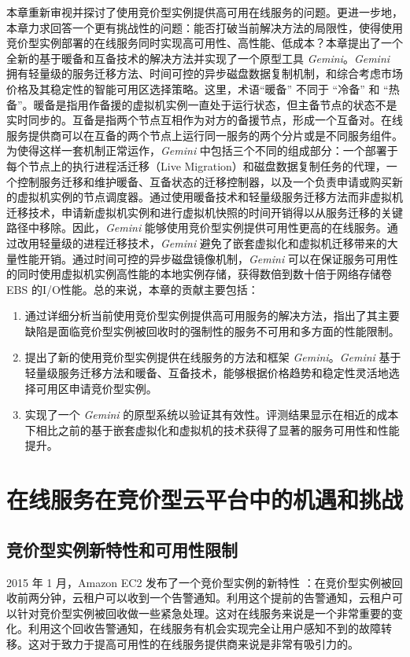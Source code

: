 本章重新审视并探讨了使用竞价型实例提供高可用在线服务的问题。更进一步地，本章力求回答一个更有挑战性的问题：能否打破当前解决方法的局限性，使得使用竞价型实例部署的在线服务同时实现高可用性、高性能、低成本？本章提出了一个全新的基于暖备和互备技术的解决方法并实现了一个原型工具 \emph{Gemini}。\emph{Gemini} 拥有轻量级的服务迁移方法、时间可控的异步磁盘数据复制机制，和综合考虑市场价格及其稳定性的智能可用区选择策略。这里，术语``暖备'' 不同于 ``冷备'' 和 ``热备''。暖备是指用作备援的虚拟机实例一直处于运行状态，但主备节点的状态不是实时同步的。互备是指两个节点互相作为对方的备援节点，形成一个互备对。在线服务提供商可以在互备的两个节点上运行同一服务的两个分片或是不同服务组件。为使得这样一套机制正常运作，\emph{Gemini} 中包括三个不同的组成部分：一个部署于每个节点上的执行进程活迁移（Live Migration）和磁盘数据复制任务的代理，一个控制服务迁移和维护暖备、互备状态的迁移控制器，以及一个负责申请或购买新的虚拟机实例的节点调度器。通过使用暖备技术和轻量级服务迁移方法而非虚拟机迁移技术，申请新虚拟机实例和进行虚拟机快照的时间开销得以从服务迁移的关键路径中移除。因此，\emph{Gemini} 能够使用竞价型实例提供可用性更高的在线服务。通过改用轻量级的进程迁移技术，\emph{Gemini} 避免了嵌套虚拟化和虚拟机迁移带来的大量性能开销。通过时间可控的异步磁盘镜像机制，\emph{Gemini} 可以在保证服务可用性的同时使用虚拟机实例高性能的本地实例存储，获得数倍到数十倍于网络存储卷 EBS 的I/O性能。总的来说，本章的贡献主要包括：
\begin{enumerate}
\item 通过详细分析当前使用竞价型实例提供高可用服务的解决方法，指出了其主要缺陷是面临竞价型实例被回收时的强制性的服务不可用和多方面的性能限制。
\item 提出了新的使用竞价型实例提供在线服务的方法和框架 \emph{Gemini}。\emph{Gemini} 基于轻量级服务迁移方法和暖备、互备技术，能够根据价格趋势和稳定性灵活地选择可用区申请竞价型实例。
\item 实现了一个 \emph{Gemini} 的原型系统以验证其有效性。评测结果显示在相近的成本下相比之前的基于嵌套虚拟化和虚拟机的技术获得了显著的服务可用性和性能提升。
\end{enumerate}

\section{在线服务在竞价型云平台中的机遇和挑战}
\subsection{竞价型实例新特性和可用性限制}
2015 年 1 月，Amazon EC2 发布了一个竞价型实例的新特性 \cite{AWS_SITN:2016}：在竞价型实例被回收前两分钟，云租户可以收到一个告警通知。利用这个提前的告警通知，云租户可以针对竞价型实例被回收做一些紧急处理。这对在线服务来说是一个非常重要的变化。利用这个回收告警通知，在线服务有机会实现完全让用户感知不到的故障转移。这对于致力于提高可用性的在线服务提供商来说是非常有吸引力的。

